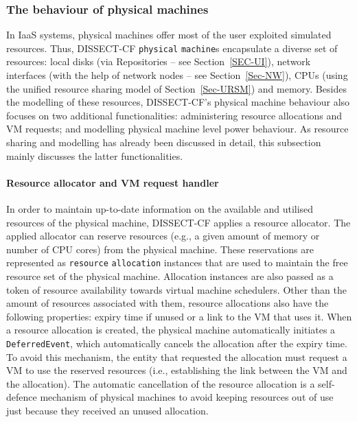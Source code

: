 \documentclass[sort, compress, 5p]{elsarticle}
\begin{document}
\subsubsection{The behaviour of physical machines}

In IaaS systems, physical machines offer most of the user exploited simulated resources. Thus, DISSECT-CF \verb+physical+ \verb+machine+s encapsulate a diverse set of resources: local disks (via Repositories -- see Section~\ref{SEC-UI}), network interfaces (with the help of network nodes -- see Section~\ref{Sec-NW}), CPUs (using the unified resource sharing model of Section~\ref{Sec-URSM}) and memory. Besides the modelling of these resources, DISSECT-CF's physical machine behaviour also focuses on two additional functionalities: administering resource allocations and VM requests; and modelling physical machine level power behaviour. As resource sharing and modelling has already been discussed in detail, this subsection mainly discusses the latter functionalities.

\paragraph{Resource allocator and VM request handler} In order to maintain up-to-date information on the available and utilised resources of the physical machine, DISSECT-CF applies a resource allocator. The applied allocator can reserve resources (e.g., a given amount of memory or number of CPU cores) from the physical machine. These reservations are represented as \verb+resource+ \verb+allocation+ instances that are used to maintain the free resource set of the physical machine. Allocation instances are also passed as a token of resource availability towards virtual machine schedulers. Other than the amount of resources associated with them, resource allocations also have the following properties: expiry time if unused or a link to the VM that uses it. When a resource allocation is created, the physical machine automatically initiates a \verb+DeferredEvent+, which automatically cancels the allocation after the expiry time. To avoid this mechanism, the entity that requested the allocation must request a VM to use the reserved resources (i.e., establishing the link between the VM and the allocation). The automatic cancellation of the resource allocation is a self-defence mechanism of physical machines to avoid keeping resources out of use just because they received an unused allocation.
\end{document}
